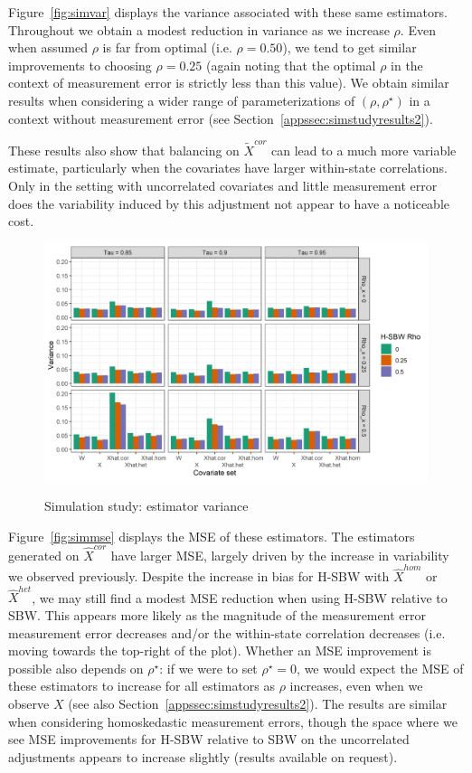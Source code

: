 Figure~\ref{fig:simvar} displays the variance associated with these same estimators. Throughout we obtain a modest reduction in variance as we increase $\rho$. Even when assumed $\rho$ is far from optimal (i.e. $\rho = 0.50$), we tend to get similar improvements to choosing $\rho = 0.25$ (again noting that the optimal $\rho$ in the context of measurement error is strictly less than this value). We obtain similar results when considering a wider range of parameterizations of $(\rho, \rho^\star)$ in a context without measurement error (see Section~\ref{appssec:simstudyresults2}).

These results also show that balancing on $\tilde{X}^{cor}$ can lead to a much more variable estimate, particularly when the covariates have larger within-state correlations. Only in the setting with uncorrelated covariates and little measurement error does the variability induced by this adjustment not appear to have a noticeable cost.

\begin{figure}[H]
\begin{center}
    \caption{Simulation study: estimator variance}\label{fig:simvar}
    \label{fig:loveplotc1}
    \includegraphics[scale=0.5]{01_Plots/var-plot.png}
\end{center}
\end{figure}

Figure~\ref{fig:simmse} displays the MSE of these estimators. The estimators generated on $\hat{X}^{cor}$ have larger MSE, largely driven by the increase in variability we observed previously. Despite the increase in bias for H-SBW with $\hat{X}^{hom}$ or $\hat{X}^{het}$, we may still find a modest MSE reduction when using H-SBW relative to SBW. This appears more likely as the magnitude of the measurement error measurement error decreases and/or the within-state correlation decreases (i.e. moving towards the top-right of the plot). Whether an MSE improvement is possible also depends on $\rho^\star$: if we were to set $\rho^\star = 0$, we would expect the MSE of these estimators to increase for all estimators as $\rho$ increases, even when we observe $X$ (see also Section~\ref{appssec:simstudyresults2}). The results are similar when considering homoskedastic measurement errors, though the space where we see MSE improvements for H-SBW relative to SBW on the uncorrelated adjustments appears to increase slightly (results available on request). 

